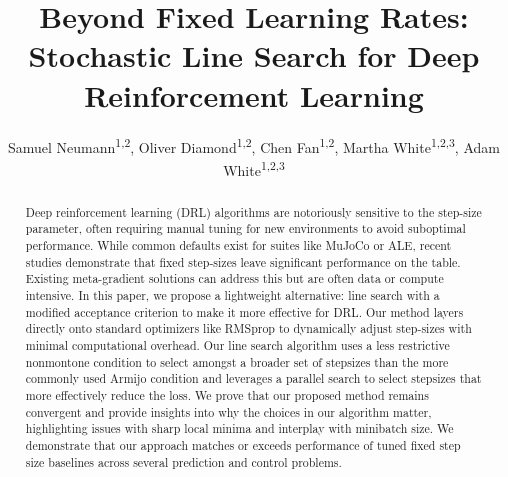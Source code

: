 \documentclass[10pt]{article} %
\title{Beyond Fixed Learning Rates: Stochastic Line Search for Deep Reinforcement Learning}
\author{Samuel Neumann\textsuperscript{1,2}, Oliver Diamond\textsuperscript{1,2}, Chen Fan\textsuperscript{1,2}, Martha White\textsuperscript{1,2,3}, Adam White\textsuperscript{1,2,3}}
\begin{document}
\makeCover  %
\maketitle  %

\begin{abstract}
Deep reinforcement learning (DRL) algorithms are notoriously sensitive to the step-size parameter, often requiring manual tuning for new environments to avoid suboptimal performance. While common defaults exist for suites like MuJoCo or ALE, recent studies demonstrate that fixed step-sizes leave significant performance on the table. Existing meta-gradient solutions can address this but are often data or compute intensive. In this paper, we propose a lightweight alternative: line search with a modified acceptance criterion to make it more effective for DRL. Our method layers directly onto standard optimizers like RMSprop to dynamically adjust step-sizes with minimal computational overhead. Our line search algorithm uses a less restrictive nonmontone condition to select amongst a broader set of stepsizes than the more commonly used Armijo condition and leverages a parallel search to select stepsizes that more effectively reduce the loss. 
We prove that our proposed method remains convergent and provide insights into why the choices in our algorithm matter, highlighting issues with sharp local minima and interplay with minibatch size. We demonstrate that our approach matches or exceeds performance of tuned fixed step size baselines across several prediction and control problems.
\end{abstract}
\end{document}
